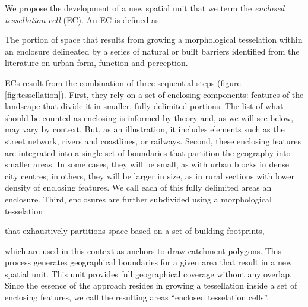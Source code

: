 We propose the development of a new spatial unit that we term the
\textit{enclosed tessellation cell} (EC).
An EC is defined as:
\begin{theorem}
        The portion of space that results from growing a morphological
tesselation within an enclosure delineated by a series of natural or built
barriers identified from the literature on urban form, function and perception.
\end{theorem}
ECs result from the combination of
three sequential steps (figure \ref{fig:tessellation}).
First, they rely on a set of enclosing components: features of the landscape
that divide it in smaller, fully delimited portions. The list of what should be
counted as enclosing is informed by theory and, as we will see below, may vary
by context. But, as an illustration, it includes elements such as the street
network, rivers and coastlines, or railways.
Second, these enclosing features are integrated into a single set of boundaries
that partition the geography into smaller areas. In some cases, they will be
small, as with urban blocks in dense city centres; in others, they will be
larger in size, as in rural sections with lower density of enclosing features.
We call each of this fully delimited areas an enclosure.
Third, enclosures are further subdivided using a morphological tesselation
\citep{fleischmann2020morphological}

that exhaustively partitions space based on a set of building footprints,

which are used in this context as anchors to draw catchment polygons.
This process generates geographical boundaries for a given area that result in a
new spatial unit. This unit provides full geographical coverage without any
overlap.
%
Since the essence of the approach resides in growing a tessellation inside a set
of enclosing features, we call the resulting areas ``enclosed tesselation
cells''.

